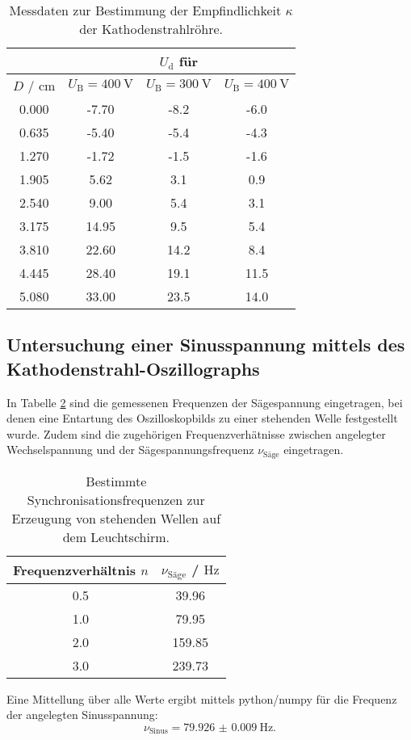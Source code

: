 \begin{table}
	\caption{Messdaten zur Bestimmung der Empfindlichkeit $\kappa$ der Kathodenstrahlröhre.}
	\label{tab:efeldtab}
	\centering
	\begin{tabular}{cccc}
	\toprule
		& & $U_{\mathrm{d}}$ für & \\
		\midrule
		$D$ / \si{\centi\meter} & $U_{\mathrm{B}}=\SI{400}{\volt}$ & $U_{\mathrm{B}}=\SI{300}{\volt}$ & $U_{\mathrm{B}}=\SI{400}{\volt}$ \\
		\midrule
		0.000 & -7.70 & -8.2 & -6.0 \\
		0.635 & -5.40 & -5.4 & -4.3 \\
		1.270 & -1.72 & -1.5 & -1.6 \\
		1.905 & 5.62 & 3.1 & 0.9 \\
		2.540 & 9.00 & 5.4 & 3.1 \\
		3.175 & 14.95 & 9.5 & 5.4 \\
		3.810 & 22.60 & 14.2 & 8.4 \\
		4.445 & 28.40 & 19.1 & 11.5 \\
		5.080 & 33.00 & 23.5 & 14.0 \\
	\bottomrule
	\end{tabular}
\end{table}


\subsection{Untersuchung einer Sinusspannung mittels des Kathodenstrahl-Oszillographs}
In Tabelle \ref{tab:saegen} sind die gemessenen Frequenzen der Sägespannung eingetragen, bei denen eine Entartung des Oszilloskopbilds zu einer stehenden Welle festgestellt wurde. Zudem sind die zugehörigen Frequenzverhätnisse zwischen angelegter Wechselspannung und der Sägespannungsfrequenz $\nu_\mathrm{Säge}$ eingetragen.
\begin{table}
	\caption{Bestimmte Synchronisationsfrequenzen zur Erzeugung von stehenden Wellen auf dem Leuchtschirm.}
	\label{tab:saegen}
	\centering
	\begin{tabular}{cc}
	\toprule
		Frequenzverhältnis $n$ & $\nu_\mathrm{Säge}$ / $\si{\hertz}$ \\
	\midrule
		0.5 & 39.96 \\
		1.0 & 79.95 \\
		2.0 & 159.85 \\
		3.0 & 239.73 \\
	\bottomrule
	\end{tabular}
\end{table}
Eine Mittellung über alle Werte ergibt mittels python/numpy \cite{numpy} für die Frequenz der angelegten Sinusspannung:
\begin{equation*}
	\nu_\mathrm{Sinus}=\SI{79.926(9)}{\hertz} \text{.}
\end{equation*}



